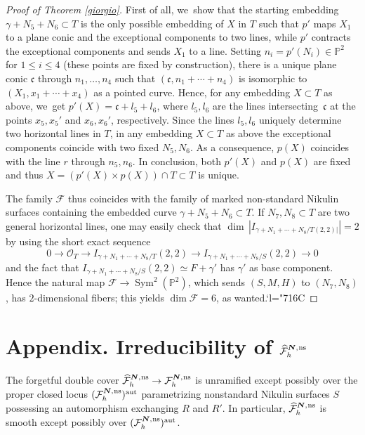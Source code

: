 \documentclass[11pt]{article}
\newcommand{\Changelback}{\mathcode`l="716C}
\newcommand{\aut}{{\mathrm{aut}}}
\newcommand{\ns}{{\mkern1mu\mathrm{ns}}}
\newcommand{\bN}{\boldsymbol{N}}
\theoremstyle{plain}
\theoremstyle{definition}
\DeclareMathOperator{\Sym}{Sym}
\newcommand\PP{{\mathbb P}}
\newcommand\F{{\mathcal F}}
\renewcommand\O{{\mathcal O}}
\begin{document}
\begin{proof}[Proof of Theorem \ref{giorgio}]
First of all, we~show that the starting embedding $\gamma+N_5+N_6\subset T$ is the only possible embedding of $X$ in $T$ such that $p'$ maps $X_1$ to a plane conic and the exceptional components to two lines, while $p'$ contracts the exceptional components and sends $X_1$ to a line. Setting $n_i=p'(N_i)\in\PP^2$ for $1\leq i\leq 4$ (these points are fixed by construction), there is a unique plane conic $\mathfrak c$ through $n_1,\ldots, n_4$ such that $(\mathfrak c,n_1+\cdots+n_4)$ is isomorphic to $(X_1,x_1+\cdots+x_4)$ as a pointed curve. Hence, for any embedding $X\subset T$ as above, we~get $p'(X)=\mathfrak c+l_5+l_6$, where $l_5,l_6$ are the lines intersecting~$\mathfrak c$ at the points $x_5,x_5'$ and $x_6,x_6'$, respectively. Since the lines $l_5,l_6$ uniquely determine two horizontal lines in $T$, in any embedding $X\subset T$ as above the exceptional components coincide with two fixed $N_5,N_6$. As a consequence, $p(X)$ coincides with the line $r$ through $n_5,n_6$. In conclusion, both $p'(X)$ and $p(X)$ are fixed and thus $X=(p'(X)\times p(X))\cap T\subset T$ is unique.

The family $\F$ thus coincides with the family of marked non-standard Nikulin surfaces containing the embedded curve $\gamma+N_5+N_6\subset T$. If $N_7,N_8\subset T$ are two general horizontal lines, one may easily check that $\dim\,|I_{\gamma+N_1+\cdots+N_8/T(2,2)|}|=2$ by using the short exact sequence\vspace*{-3pt}
\[
0\to \O_T\to I_{\gamma+N_1+\cdots+N_8/T}(2,2)\to I_{\gamma+N_1+\cdots+N_8/S}(2,2)\to 0
\]
and the fact that $I_{\gamma+N_1+\cdots+N_8/S}(2,2)\simeq F+\gamma'$ has $\gamma'$ as base component. Hence the natural map $\F\to \Sym^2(\mathbb P^2)$, which sends $(S,M,H)$ to $(N_7,N_8)$, has $2$-dimensional fibers; this yields $\dim\F=6$, as wanted.\Changelback
\end{proof}

\appendix

\section*{Appendix. Irreducibility of \texorpdfstring{$\widehat{\F}_h^{\bN,\ns}$}{F}}

The forgetful double cover $\widehat{\F}_h^{\bN,\ns} \to \F_h^{\bN,\ns}$ is unramified except possibly over the proper closed locus $(\F_h^{\bN,\ns})^\aut$ parametrizing nonstandard Nikulin surfaces $S$ \hbox{possessing} an automorphism exchanging $R$ and $R'$. In particular, $\widehat{\F}_h^{\bN,\ns}$ is
smooth except possibly over $(\F_h^{\bN,\ns})^\aut$.
\end{document}
